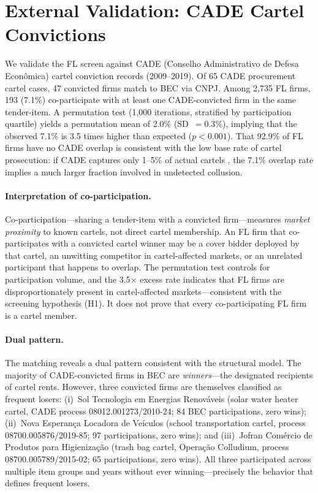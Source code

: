 \section{External Validation: CADE Cartel Convictions}
\label{sec:cade}

We validate the FL screen against CADE (Conselho Administrativo de
Defesa Econ\^omica) cartel conviction records (2009--2019). Of 65
CADE procurement cartel cases, 47 convicted firms match to BEC via
CNPJ. Among 2,735 FL firms, 193 (7.1\%) co-participate with at least
one CADE-convicted firm in the same tender-item. A permutation test
(1,000 iterations, stratified by participation quartile) yields a
permutation mean of 2.0\% (SD~$= 0.3$\%), implying that the observed
7.1\% is 3.5 times higher than expected ($p < 0.001$). That 92.9\%
of FL firms have no CADE overlap is consistent with the low base rate
of cartel prosecution: if CADE captures only 1--5\% of actual cartels
\citep{connor2007price}, the 7.1\% overlap rate implies a much larger
fraction involved in undetected collusion.

\paragraph{Interpretation of co-participation.}
Co-participation---sharing a tender-item with a convicted firm---measures
\emph{market proximity} to known cartels, not direct cartel membership.
An FL firm that co-participates with a convicted cartel winner may be a
cover bidder deployed by that cartel, an unwitting competitor in
cartel-affected markets, or an unrelated participant that happens to
overlap. The permutation test controls for participation volume, and
the 3.5$\times$ excess rate indicates that FL firms are
disproportionately present in cartel-affected markets---consistent with
the screening hypothesis (H1). It does not prove that every
co-participating FL firm is a cartel member.

\paragraph{Dual pattern.}
The matching reveals a dual pattern consistent with the structural
model. The majority of CADE-convicted firms in BEC are
\emph{winners}---the designated recipients of cartel rents. However,
three convicted firms are themselves classified as frequent losers:
(i)~Sol Tecnologia em Energias Renov\'aveis (solar water heater
cartel, CADE process 08012.001273/2010-24; 84 BEC participations,
zero wins); (ii)~Nova Esperan\c{c}a Locadora de Ve\'iculos (school
transportation cartel, process 08700.005876/2019-85; 97
participations, zero wins); and (iii)~Jofran Com\'ercio de Produtos
para Higieniza\c{c}\~ao (trash bag cartel, Opera\c{c}\~ao Colludium,
process 08700.005789/2015-02; 65 participations, zero wins). All three
participated across multiple item groups and years without ever
winning---precisely the behavior that defines frequent losers.

